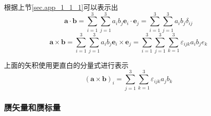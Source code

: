 			根据上节\ref{sec.app_1_1_1}可以表示出
				\begin{equation}
					\boldsymbol{a} \cdot \boldsymbol{b}=\sum_{i=1}^{3} \sum_{j=1}^{3} a_{i} b_{j} \boldsymbol{e}_{i} \cdot \boldsymbol{e}_{j}=\sum_{i=1}^{3} \sum_{j=1}^{3} a_{i} b_{j} \delta_{i j}
				\end{equation}
				\begin{equation}
					\boldsymbol{a} \times \boldsymbol{b}=\sum_{i=1}^{3} \sum_{j=1}^{3} a_{i} b_{j} \boldsymbol{e}_{i} \times \boldsymbol{e}_{j}=\sum_{i=1}^{3} \sum_{j=1}^{3} \sum_{k=1}^{3} \varepsilon_{i j k} a_{i} b_{j} e_{k}
				\end{equation}

			上面的矢积使用更直白的分量式进行表示
			\begin{equation}
				(\boldsymbol{a} \times \boldsymbol{b})_{i}=\sum_{j=1}^{3} \sum_{k=1}^{3} \varepsilon_{i j k} a_{j} b_{k}
			\end{equation}
		\subsubsection*{赝矢量和赝标量}
			








